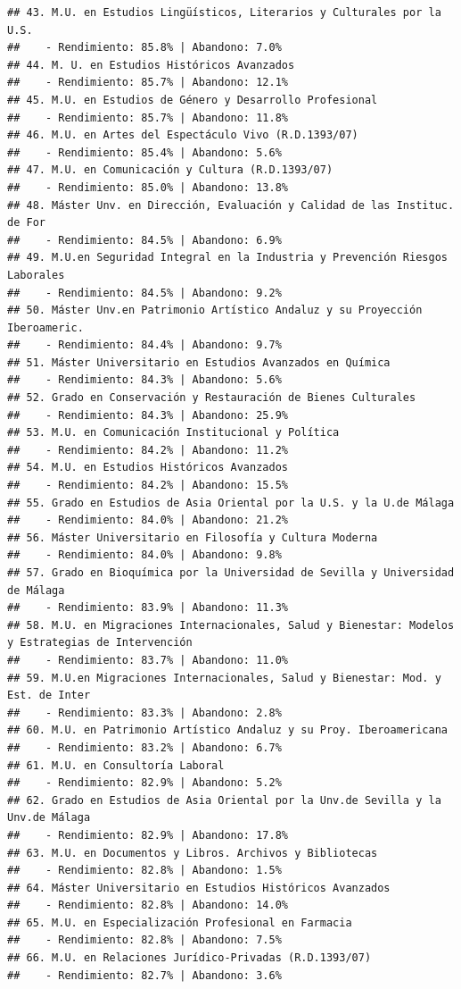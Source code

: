 \documentclass[
]{article}
\begin{document}
\begin{verbatim}
## 43. M.U. en Estudios Lingüísticos, Literarios y Culturales por la U.S.
##    - Rendimiento: 85.8% | Abandono: 7.0%
## 44. M. U. en Estudios Históricos Avanzados
##    - Rendimiento: 85.7% | Abandono: 12.1%
## 45. M.U. en Estudios de Género y Desarrollo Profesional
##    - Rendimiento: 85.7% | Abandono: 11.8%
## 46. M.U. en Artes del Espectáculo Vivo (R.D.1393/07)
##    - Rendimiento: 85.4% | Abandono: 5.6%
## 47. M.U. en Comunicación y Cultura (R.D.1393/07)
##    - Rendimiento: 85.0% | Abandono: 13.8%
## 48. Máster Unv. en Dirección, Evaluación y Calidad de las Instituc. de For
##    - Rendimiento: 84.5% | Abandono: 6.9%
## 49. M.U.en Seguridad Integral en la Industria y Prevención Riesgos Laborales
##    - Rendimiento: 84.5% | Abandono: 9.2%
## 50. Máster Unv.en Patrimonio Artístico Andaluz y su Proyección Iberoameric.
##    - Rendimiento: 84.4% | Abandono: 9.7%
## 51. Máster Universitario en Estudios Avanzados en Química
##    - Rendimiento: 84.3% | Abandono: 5.6%
## 52. Grado en Conservación y Restauración de Bienes Culturales
##    - Rendimiento: 84.3% | Abandono: 25.9%
## 53. M.U. en Comunicación Institucional y Política
##    - Rendimiento: 84.2% | Abandono: 11.2%
## 54. M.U. en Estudios Históricos Avanzados
##    - Rendimiento: 84.2% | Abandono: 15.5%
## 55. Grado en Estudios de Asia Oriental por la U.S. y la U.de Málaga
##    - Rendimiento: 84.0% | Abandono: 21.2%
## 56. Máster Universitario en Filosofía y Cultura Moderna
##    - Rendimiento: 84.0% | Abandono: 9.8%
## 57. Grado en Bioquímica por la Universidad de Sevilla y Universidad de Málaga
##    - Rendimiento: 83.9% | Abandono: 11.3%
## 58. M.U. en Migraciones Internacionales, Salud y Bienestar: Modelos y Estrategias de Intervención
##    - Rendimiento: 83.7% | Abandono: 11.0%
## 59. M.U.en Migraciones Internacionales, Salud y Bienestar: Mod. y Est. de Inter
##    - Rendimiento: 83.3% | Abandono: 2.8%
## 60. M.U. en Patrimonio Artístico Andaluz y su Proy. Iberoamericana
##    - Rendimiento: 83.2% | Abandono: 6.7%
## 61. M.U. en Consultoría Laboral
##    - Rendimiento: 82.9% | Abandono: 5.2%
## 62. Grado en Estudios de Asia Oriental por la Unv.de Sevilla y la Unv.de Málaga
##    - Rendimiento: 82.9% | Abandono: 17.8%
## 63. M.U. en Documentos y Libros. Archivos y Bibliotecas
##    - Rendimiento: 82.8% | Abandono: 1.5%
## 64. Máster Universitario en Estudios Históricos Avanzados
##    - Rendimiento: 82.8% | Abandono: 14.0%
## 65. M.U. en Especialización Profesional en Farmacia
##    - Rendimiento: 82.8% | Abandono: 7.5%
## 66. M.U. en Relaciones Jurídico-Privadas (R.D.1393/07)
##    - Rendimiento: 82.7% | Abandono: 3.6%

\end{verbatim}
\end{document}

